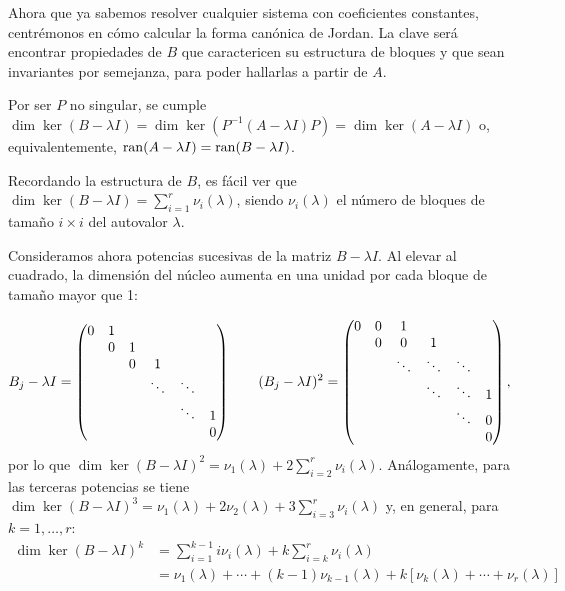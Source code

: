 \documentclass[../ecuaciones_diferenciales.tex]{subfiles}
\begin{document}
Ahora que ya sabemos resolver cualquier sistema con coeficientes constantes,
centrémonos en cómo calcular la forma canónica de Jordan. La clave será
encontrar propiedades de \(B\) que caractericen su estructura de bloques y que
sean invariantes por semejanza, para poder hallarlas a partir de \(A\).

Por ser \(P\) no singular, se cumple \(\dim \ker (B - \lambda I) = \dim \ker
(P^{-1}(A - \lambda I)P) = \dim \ker (A - \lambda I)\) o, equivalentemente,
\(\operatorname{ran} (A - \lambda I) = \operatorname{ran} (B - \lambda I)\).

Recordando la estructura de \(B\), es fácil ver que
\(\dim \ker (B - \lambda I) = \sum_{i=1}^r \nu_i(\lambda)\), siendo
\(\nu_i(\lambda)\) el número de bloques de tamaño \(i \times i\) del autovalor
\(\lambda\).

Consideramos ahora potencias sucesivas de la matriz \(B - \lambda I\). Al
elevar al cuadrado, la dimensión del núcleo aumenta en una unidad por cada
bloque de tamaño mayor que 1:

\[
	B_j - \lambda I =
	\begin{pmatrix}0 & 1 &   &        &        &   \\
		& 0 & 1 &        &        &   \\
		&   & 0 & 1      &        &   \\
		&   &   & \ddots & \ddots &   \\
		&   &   &        & \ddots & 1 \\
		&   &   &        &        & 0 \\\end{pmatrix} \qquad
	(B_j - \lambda I)^2 =
	\begin{pmatrix}0 & 0 & 1      &        &        &   \\
		& 0 & 0      & 1      &        &   \\
		&   & \ddots & \ddots & \ddots &   \\
		&   &        & \ddots & \ddots & 1 \\
		&   &        &        & \ddots & 0 \\
		&   &        &        &        & 0 \\\end{pmatrix},
\]
por lo que
\(\dim \ker (B - \lambda I)^2 = \nu_1(\lambda) + 2 \sum_{i=2}^r
\nu_i(\lambda)\). Análogamente, para las terceras potencias se tiene
\(\dim \ker (B - \lambda I)^3 = \nu_1(\lambda) + 2\nu_2(\lambda) + 3
\sum_{i=3}^r \nu_i(\lambda)\) y, en general, para \(k = 1, \dots, r\):
\begin{align*}
	\dim \ker (B - \lambda I)^k & = \sum_{i=1}^{k-1} i \nu_i(\lambda) + k
	\sum_{i=k}^r \nu_i(\lambda)                                                         \\
	                            & = \nu_1(\lambda) + \cdots + (k-1)\nu_{k-1}(\lambda) +
	k[\nu_k(\lambda) + \cdots + \nu_r(\lambda)]
\end{align*}
\end{document}
